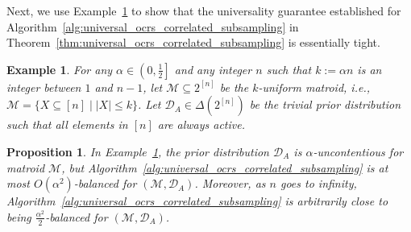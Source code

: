 \documentclass[11pt]{article}
\newcommand{\D}{\mathcal D}
\newcommand{\M}{{\mathcal M}}
\newtheorem{example}[theorem]{Example}
\newtheorem{proposition}{Proposition}[section]
\begin{document}
Next, we use Example~\ref{ex:correlated_subsampling_lower_bound} to show that the universality guarantee established for Algorithm~\ref{alg:universal_ocrs_correlated_subsampling} in Theorem~\ref{thm:universal_ocrs_correlated_subsampling} is essentially tight.
\begin{example}\label{ex:correlated_subsampling_lower_bound}
For any $\alpha\in\left(0,\frac{1}{2}\right]$ and any integer $n$ such that $k:=\alpha n$ is an integer between $1$ and $n-1$, let $\M\subseteq 2^{[n]}$ be the $k$-uniform matroid, i.e., $\M=\{X\subseteq[n]\mid |X|\le k\}$. Let $\D_A\in\Delta(2^{[n]})$ be the trivial prior distribution such that all elements in $[n]$ are always active.
\end{example}

\begin{proposition}
In Example~\ref{ex:correlated_subsampling_lower_bound}, the prior distribution $\D_A$ is $\alpha$-uncontentious for matroid $\M$, but Algorithm~\ref{alg:universal_ocrs_correlated_subsampling} is at most $O(\alpha^2)$-balanced for $(\M,\D_A)$. Moreover, as $n$ goes to infinity, Algorithm~\ref{alg:universal_ocrs_correlated_subsampling} is arbitrarily close to being $\frac{\alpha^2}{2}$-balanced for $(\M,\D_A)$.
\end{proposition}
\end{document}

